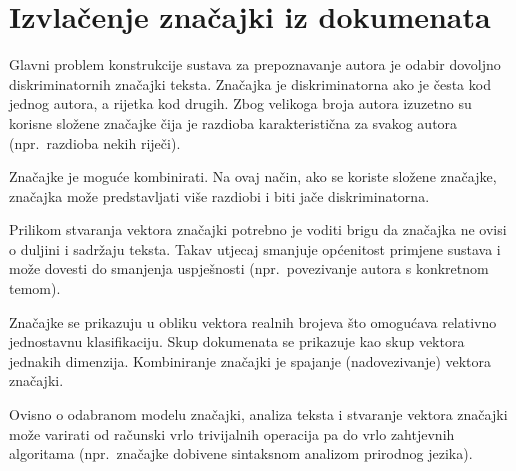 \documentclass[11pt,english]{article}
\begin{document}
\begin{multicols}{2}
\begin{minipage}{0.8\linewidth}
\vspace{10pt}
\centerline{\resizebox{1.4\linewidth}{!}{}}%
%
\label{fig:wordsPerAuthor}
\end{minipage}

\begin{minipage}{0.8\linewidth}
\vspace{10pt}
\centerline{\resizebox{1.4\linewidth}{!}{}}%
%
\label{fig:avgWordsPerAuthorArticle}
\end{minipage}

\section{Izvlačenje značajki iz dokumenata}
Glavni problem konstrukcije sustava za prepoznavanje autora je odabir dovoljno
diskriminatornih značajki teksta. Značajka je diskriminatorna ako je česta kod
jednog autora, a rijetka kod drugih. Zbog velikoga broja autora izuzetno su
korisne složene značajke čija je razdioba karakteristična za svakog autora
(npr.~razdioba nekih riječi).

Značajke je moguće kombinirati. Na ovaj način, ako se koriste složene značajke,
značajka može predstavljati više razdiobi i biti jače diskriminatorna.

Prilikom stvaranja vektora značajki potrebno je voditi brigu da značajka ne
ovisi o duljini i sadržaju teksta. Takav utjecaj smanjuje općenitost primjene
sustava i može dovesti do smanjenja uspješnosti (npr.~povezivanje autora s
konkretnom temom).

Značajke se prikazuju u obliku vektora realnih brojeva što omogućava relativno
jednostavnu klasifikaciju. Skup dokumenata se prikazuje kao skup vektora jednakih
dimenzija. Kombiniranje značajki je spajanje (nadovezivanje) vektora značajki.


Ovisno o odabranom modelu značajki, analiza teksta i stvaranje vektora značajki
može varirati od računski vrlo trivijalnih operacija pa do vrlo zahtjevnih
algoritama (npr.~značajke dobivene sintaksnom analizom prirodnog jezika).



\end{multicols}
\end{document}
